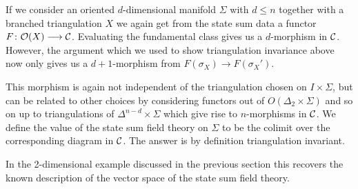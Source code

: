 If we consider an oriented $d$-dimensional manifold $\Sigma$ with $d\leq n$ together with a  branched triangulation $X$ we again get from the state sum data a functor $F\colon \mathcal{O}(X)\longrightarrow \mathcal{C}$.
Evaluating the fundamental class gives us a $d$-morphism in
$\mathcal{C}$.
However, the argument which we used to show triangulation invariance above now only gives us a $d+1$-morphism from $F(\sigma_X) \longrightarrow F(\sigma_X')$.

This morphism is again not independent of the triangulation chosen on $I\times \Sigma $, but can be related to other choices by considering functors out of $O(\Delta_2 \times \Sigma)$ and so on up to triangulations of $\Delta^{n-d}\times \Sigma $ which give rise to $n$-morphisms in $\mathcal{C}$.
We define the value of the state sum field theory on $\Sigma$ to be the colimit over the corresponding diagram in $\mathcal{C}$.
The answer is by definition triangulation invariant.


In the 2-dimensional example discussed in the previous section this recovers the known description of the vector space of the state sum field theory.

